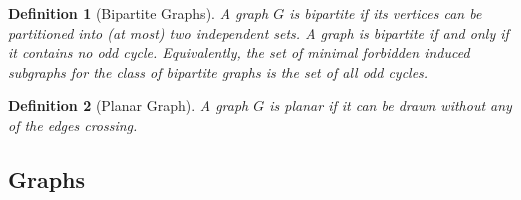 \documentclass[]{article}
\theoremstyle{break}
\theoremstyle{break}
\newtheorem{definition}{Definition}[section]
\begin{document}
	\begin{definition} [Bipartite Graphs]
		A graph $G$ is bipartite if its vertices can be partitioned into (at most) two independent sets. A graph is bipartite if and only if it contains no odd cycle. Equivalently, the set of minimal forbidden induced subgraphs for the class of bipartite graphs is the set of all odd cycles.
	\end{definition}

	\begin{definition} [Planar Graph]
		A graph $G$ is planar if it can be drawn without any of the edges crossing.
	\end{definition}
\subsection{Graphs}
\end{document}
